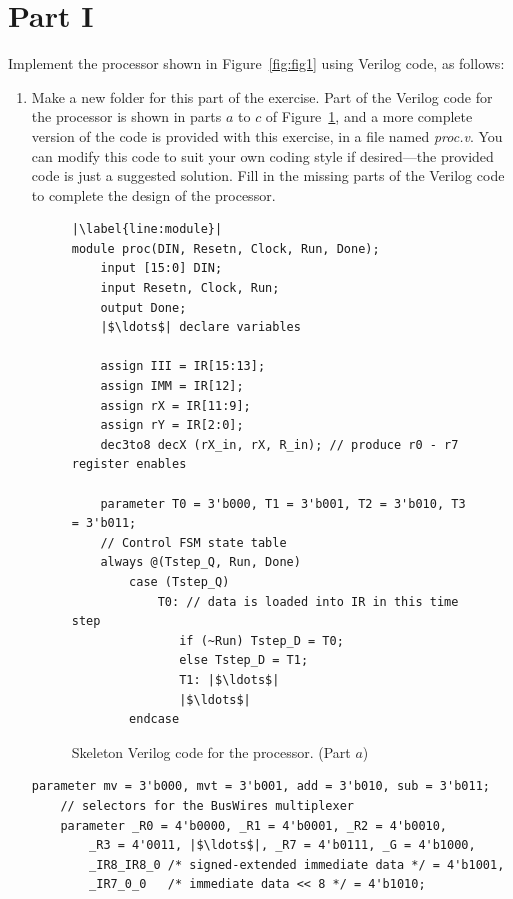 \documentclass[epsfig,10pt,fullpage]{article} \addtolength{\textwidth}{1.5in}
\begin{document}
\section*{Part I}
Implement the processor shown in Figure~\ref{fig:fig1} using Verilog code, as follows:
\begin{enumerate}
\item Make a new folder for this part of the exercise. 
Part of the Verilog code for the processor is shown in parts $a$ to $c$ of 
Figure~\ref{fig:fig2}, and a more complete version of the code is provided with this exercise,
in a file named {\it proc.v}. You can modify this code to suit your own coding style
if desired---the provided code is just a suggested solution. Fill in the missing parts of
the Verilog code to complete the design of the processor.

\lstset{language=Verilog,numbers=none,escapechar=|}
\begin{figure}[h]
\begin{center}
\begin{minipage}[t]{15 cm}
\begin{lstlisting}[name=proc]
|\label{line:module}|
module proc(DIN, Resetn, Clock, Run, Done);
    input [15:0] DIN;
    input Resetn, Clock, Run;
    output Done;
    |$\ldots$| declare variables

    assign III = IR[15:13];
    assign IMM = IR[12];
    assign rX = IR[11:9];
    assign rY = IR[2:0];
    dec3to8 decX (rX_in, rX, R_in); // produce r0 - r7 register enables

    parameter T0 = 3'b000, T1 = 3'b001, T2 = 3'b010, T3 = 3'b011;
    // Control FSM state table
    always @(Tstep_Q, Run, Done)
        case (Tstep_Q)
            T0: // data is loaded into IR in this time step
			   if (~Run) Tstep_D = T0;
			   else Tstep_D = T1;
	 		   T1: |$\ldots$|
	 		   |$\ldots$|
		endcase
\end{lstlisting}
\end{minipage}
\caption{Skeleton Verilog code for the processor. (Part $a$)}
\label{fig:fig2}
\end{center}
\end{figure}

\begin{center}
\begin{minipage}[t]{15 cm}
\begin{lstlisting}[name=proc]
    parameter mv = 3'b000, mvt = 3'b001, add = 3'b010, sub = 3'b011;
    // selectors for the BusWires multiplexer
    parameter _R0 = 4'b0000, _R1 = 4'b0001, _R2 = 4'b0010, 
        _R3 = 4'0011, |$\ldots$|, _R7 = 4'b0111, _G = 4'b1000, 
        _IR8_IR8_0 /* signed-extended immediate data */ = 4'b1001, 
        _IR7_0_0   /* immediate data << 8 */ = 4'b1010;
	

\end{lstlisting}
\end{minipage}
\end{center}
\end{enumerate}
\end{document}
